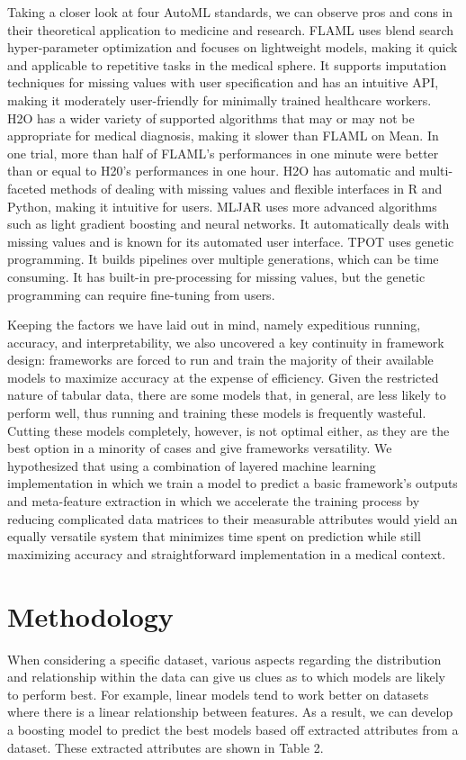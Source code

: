 \documentclass{article}
\begin{document}
Taking a closer look at four AutoML standards, we can observe pros and cons in their theoretical application to medicine and research. FLAML uses blend search hyper-parameter optimization and focuses on lightweight models, making it quick and applicable to repetitive tasks in the medical sphere. It supports imputation techniques for missing values with user specification and has an intuitive API, making it moderately user-friendly for minimally trained healthcare workers. H2O has a wider variety of supported algorithms that may or may not be appropriate for medical diagnosis, making it slower than FLAML on Mean. In one trial, more than half of FLAML's performances in one minute were better than or equal to H20's performances in one hour. H2O has automatic and multi-faceted methods of dealing with missing values and flexible interfaces in R and Python, making it intuitive for users. MLJAR uses more advanced algorithms such as light gradient boosting and neural networks. It automatically deals with missing values and is known for its automated user interface. TPOT uses genetic programming. It builds pipelines over multiple generations, which can be time consuming. It has built-in pre-processing for missing values, but the genetic programming can require fine-tuning from users. 

Keeping the factors we have laid out in mind, namely expeditious running, accuracy, and interpretability, we also uncovered a key continuity in framework design: frameworks are forced to run and train the majority of their available models to maximize accuracy at the expense of efficiency. Given the restricted nature of tabular data, there are some models that, in general, are less likely to perform well, thus running and training these models is frequently wasteful. Cutting these models completely, however, is not optimal either, as they are the best option in a minority of cases and give frameworks versatility. We hypothesized that using a combination of layered machine learning implementation in which we train a model to predict a basic framework's outputs and meta-feature extraction in which we accelerate the training process by reducing complicated data matrices to their measurable attributes would yield an equally versatile system that minimizes time spent on prediction while still maximizing accuracy and straightforward implementation in a medical context. 

\section{Methodology}
When considering a specific dataset, various aspects regarding the distribution and relationship within the data can give us clues as to which models are likely to perform best. For example, linear models tend to work better on datasets where there is a linear relationship between features. As a result, we can develop a boosting model to predict the best models based off extracted attributes from a dataset. These extracted attributes are shown in Table 2. 
\end{document}
